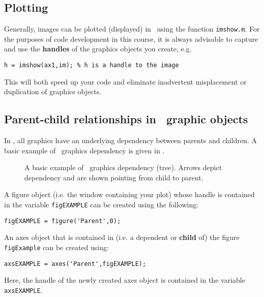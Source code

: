 \documentclass{tufte-handout}
\begin{document}
\subsection{Plotting}
Generally, images can be plotted (displayed) in \Matlab\ using the function \lstinline{imshow.m}. For the purposes of code development in this course, it is always advisable to capture and use the \textbf{handles} of the graphics objects you create, e.g.
\begin{lstlisting}[style=usnaMatlab]
h = imshow(ax1,im); % h is a handle to the image
\end{lstlisting}
This will both speed up your code and eliminate inadvertent misplacement or duplication of graphics objects. 

\subsection{Parent-child relationships in \Matlab\ graphic objects}
In \Matlab, all graphics have an underlying dependency between parents and children. A basic example of \Matlab\ graphics dependency is given in .
\begin{figure*}
\caption{A basic example of \Matlab\ graphics dependency (tree). Arrows depict dependency and are shown pointing from child to parent.}
\label{fig:1}
\end{figure*}

A figure object (i.e. the window containing your plot) whose handle is contained in the variable \lstinline{figEXAMPLE} can be created using the following:
\begin{lstlisting}[style=usnaMatlab]
figEXAMPLE = figure('Parent',0);
\end{lstlisting}

An axes object that is contained in (i.e. a dependent or \textbf{child} of) the figure \lstinline{figExample} can be created using:
\begin{lstlisting}[style=usnaMatlab]
axsEXAMPLE = axes('Parent',figEXAMPLE);
\end{lstlisting}

Here, the handle of the newly created axes object is contained in the variable \lstinline{axsEXAMPLE}. 
\end{document}
